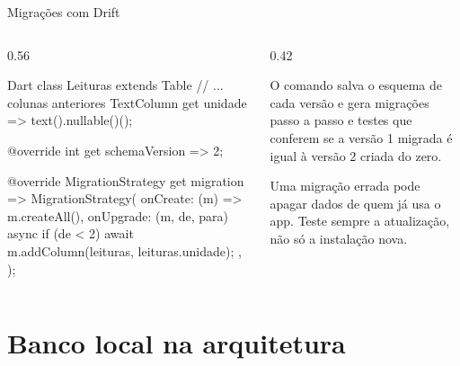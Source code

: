 \documentclass[aspectratio=169,10pt]{beamer}
\begin{document}
\begin{frame}[fragile]{Migrações com Drift}
  \begin{columns}[T]
    \begin{column}{0.56\textwidth}
\begin{codigo}[title=Versão 2: nova coluna]{Dart}
class Leituras extends Table {
  // ... colunas anteriores
  TextColumn get unidade => text().nullable()();
}

@override
int get schemaVersion => 2;

@override
MigrationStrategy get migration => MigrationStrategy(
  onCreate: (m) => m.createAll(),
  onUpgrade: (m, de, para) async {
    if (de < 2) {
      await m.addColumn(leituras, leituras.unidade);
    }
  },
);
\end{codigo}
    \end{column}
    \begin{column}{0.42\textwidth}
      \begin{conceito}
        O comando salva o esquema de cada versão e gera migrações passo a passo e testes que conferem se a versão 1 migrada é igual à versão 2 criada do zero.
      \end{conceito}
      \begin{atencao}
        Uma migração errada pode apagar dados de quem já usa o app. Teste sempre a atualização, não só a instalação nova.
      \end{atencao}
    \end{column}
  \end{columns}
\end{frame}

\section{Banco local na arquitetura}
\end{document}
